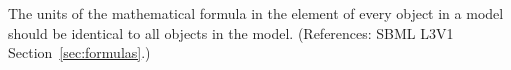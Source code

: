 The units of the mathematical formula in the  element of every
\KineticLaw object in a model should be identical to all \KineticLaw
objects in the model.  (References: SBML L3V1 Section~\ref{sec:formulas}.)
